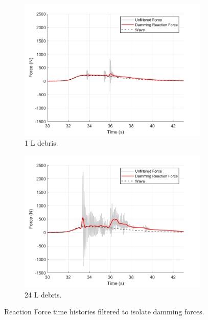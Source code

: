 \documentclass{article}
\begin{document}
{\begin{figure}[h!]
    \centering
    \begin{subfigure}[b]{0.48\textwidth}
        \centering
        \includegraphics[width=\textwidth]{Reg_Lift_U_1_L_D__Masters_NHERIDeprisImpact2_goodtests_Reg_Lift_U_1_L_Trial04_Damming.png}
        \caption{1 L debris.}
        \label{fig:timehist_1L_damming}
    \end{subfigure}
    \hfill
    \begin{subfigure}[b]{0.48\textwidth}
        \centering
        \includegraphics[width=\textwidth]{Reg_Lift_U_24_L_D__Masters_NHERIDeprisImpact2_goodtests_Reg_Lift_U_24_L_Trial04_Damming.png}
        \caption{24 L debris.}
        \label{fig:timehist_24L_damming}
    \end{subfigure}
    \caption{Reaction Force time histories filtered to isolate damming forces.}
    \label{fig:timehist_damming_combined}
\end{figure}


}
\end{document}
